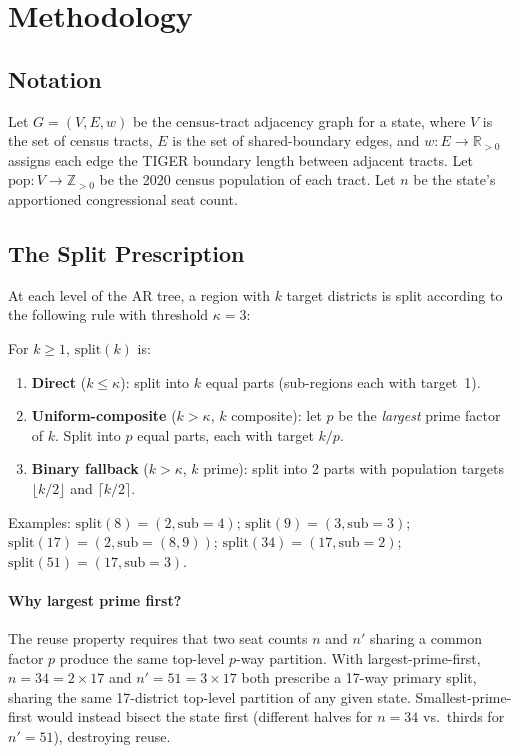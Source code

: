 \section{Methodology}
\label{sec:methodology}

\subsection{Notation}
\label{sec:notation}

Let $G = (V, E, w)$ be the census-tract adjacency graph for a state, where
$V$ is the set of census tracts, $E$ is the set of shared-boundary edges, and
$w: E \to \mathbb{R}_{>0}$ assigns each edge the TIGER boundary length between
adjacent tracts. Let $\text{pop}: V \to \mathbb{Z}_{>0}$ be the 2020 census
population of each tract. Let $n$ be the state's apportioned congressional seat
count.

\subsection{The Split Prescription}
\label{sec:factorization}

At each level of the AR tree, a region with $k$ target districts is split
according to the following rule with threshold $\kappa = 3$:

\begin{definition}
  \label{def:split}
  For $k \geq 1$, $\text{split}(k)$ is:
  \begin{enumerate}
    \item \textbf{Direct} ($k \leq \kappa$): split into $k$ equal parts
          (sub-regions each with target~1).
    \item \textbf{Uniform-composite} ($k > \kappa$, $k$ composite): let $p$ be
          the \emph{largest} prime factor of $k$. Split into $p$ equal parts,
          each with target $k/p$.
    \item \textbf{Binary fallback} ($k > \kappa$, $k$ prime): split into 2 parts
          with population targets $\lfloor k/2 \rfloor$ and $\lceil k/2 \rceil$.
  \end{enumerate}
\end{definition}

Examples: $\text{split}(8) = (2, \text{sub}=4)$; $\text{split}(9) = (3, \text{sub}=3)$;
$\text{split}(17) = (2, \text{sub}=(8,9))$; $\text{split}(34) = (17, \text{sub}=2)$;
$\text{split}(51) = (17, \text{sub}=3)$.

\paragraph{Why largest prime first?} The reuse property requires that two seat
counts $n$ and $n'$ sharing a common factor $p$ produce the same top-level
$p$-way partition. With largest-prime-first, $n=34=2\times 17$ and
$n'=51=3\times 17$ both prescribe a 17-way primary split, sharing the same
17-district top-level partition of any given state. Smallest-prime-first would
instead bisect the state first (different halves for $n=34$ vs.\ thirds for
$n'=51$), destroying reuse.

